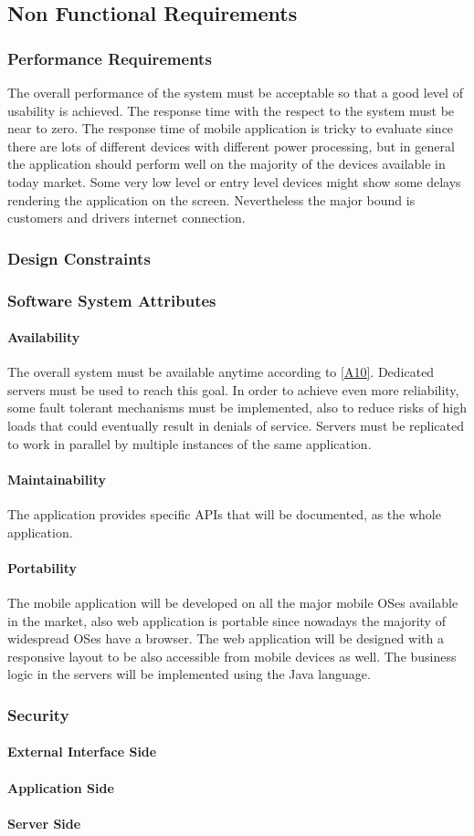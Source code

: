 \documentclass[a4paper,12pt]{article}%
\begin{document}
\subsection{Non Functional Requirements}
\subsubsection{Performance Requirements}
The overall performance of the system must be acceptable so that a good level of usability is achieved.
The response time with the respect to the system must be near to zero. The response time of mobile application is tricky to evaluate since there are lots of different devices with different power processing, but  in general the application should perform well on the majority of the devices available in today market. Some very low level or entry level devices might show some delays rendering the application on the screen. Nevertheless the major bound is customers and drivers internet connection. 
\subsubsection{Design Constraints}
\subsubsection{Software System Attributes}
\paragraph{Availability} The overall system must be available anytime according to \hyperref[a10]{[A10]}. Dedicated servers must be used to reach this goal. In order to achieve even more reliability, some fault tolerant mechanisms must be implemented, also to reduce risks of high loads that could eventually result in denials of service. Servers must be replicated to work in parallel by multiple instances of the same application. 
\paragraph{Maintainability} The application provides specific APIs that will be documented, as the whole application.
\paragraph{Portability} The mobile application will be developed on all the major mobile OSes available in the market, also web application is portable since nowadays the majority of widespread OSes have a browser. The web application will be designed with a responsive layout to be also accessible from mobile devices as well. The business logic in the servers will be implemented using the Java language.
\subsubsection{Security}
\paragraph{External Interface Side}
\paragraph{Application Side}
\paragraph{Server Side}
\end{document}
